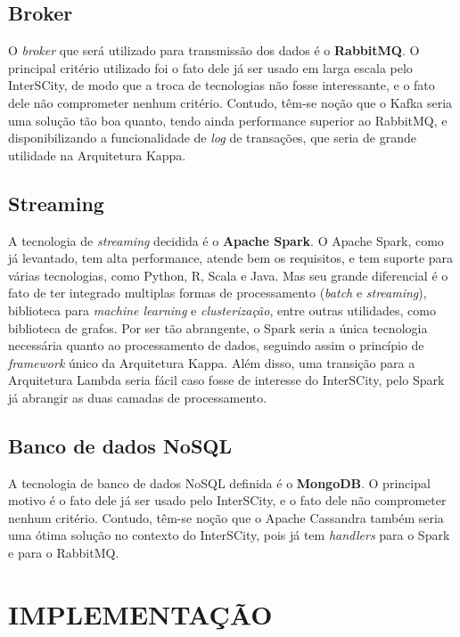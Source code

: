 \subsection{Broker}

O \textit{broker} que será utilizado para transmissão dos dados é o
\textbf{RabbitMQ}. O principal critério utilizado foi o fato dele já ser usado
em larga escala pelo InterSCity, de modo que a troca de tecnologias não fosse
interessante, e o fato dele não comprometer nenhum critério. Contudo, têm-se
noção que o Kafka seria uma solução tão boa quanto, tendo ainda performance
superior ao RabbitMQ, e disponibilizando a funcionalidade de \textit{log} de
transações, que seria de grande utilidade na Arquitetura Kappa.

\subsection{Streaming}

A tecnologia de \textit{streaming} decidida é o \textbf{Apache Spark}. O Apache
Spark, como já levantado, tem alta performance, atende bem os requisitos, e tem
suporte para várias tecnologias, como Python, R, Scala e Java. Mas seu grande
diferencial é o fato de ter integrado multiplas formas de processamento
(\textit{batch} e \textit{streaming}), biblioteca para
\textit{machine learning} e \textit{clusterização}, entre outras utilidades,
como biblioteca de grafos. Por ser tão abrangente, o Spark seria a única tecnologia
necessária quanto ao processamento de dados, seguindo assim o princípio de
\textit{framework} único da Arquitetura Kappa. Além disso, uma transição para a
Arquitetura Lambda seria fácil caso fosse de interesse do InterSCity, pelo
Spark já abrangir as duas camadas de processamento.

\subsection{Banco de dados NoSQL}

A tecnologia de banco de dados NoSQL definida é o \textbf{MongoDB}. O principal
motivo é o fato dele já ser usado pelo InterSCity, e o fato dele não
comprometer nenhum critério. Contudo, têm-se noção que o Apache Cassandra
também seria uma ótima solução no contexto do InterSCity, pois já tem
\textit{handlers} para o Spark e para o RabbitMQ.

\section{IMPLEMENTAÇÃO}

